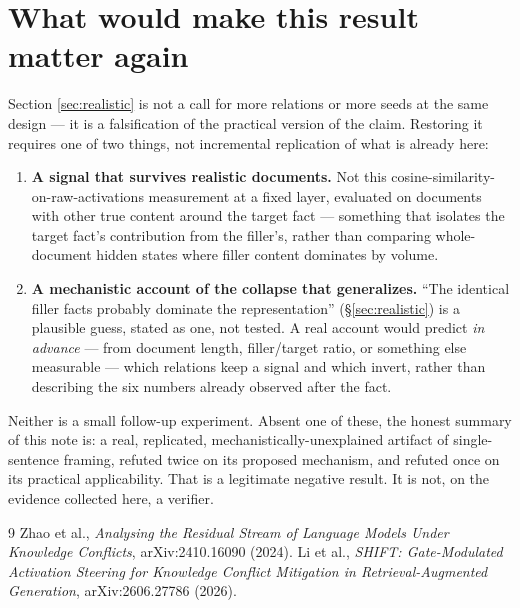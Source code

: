 \documentclass[11pt]{article}
\begin{document}
\section{What would make this result matter again}

Section \ref{sec:realistic} is not a call for more relations or more seeds at
the same design --- it is a falsification of the practical version of the
claim. Restoring it requires one of two things, not incremental replication
of what is already here:

\begin{enumerate}
\item \textbf{A signal that survives realistic documents.} Not this
  cosine-similarity-on-raw-activations measurement at a fixed layer,
  evaluated on documents with other true content around the target fact ---
  something that isolates the target fact's contribution from the filler's,
  rather than comparing whole-document hidden states where filler content
  dominates by volume.
\item \textbf{A mechanistic account of the collapse that generalizes.} ``The
  identical filler facts probably dominate the representation''
  (\S\ref{sec:realistic}) is a plausible guess, stated as one, not tested. A
  real account would predict \emph{in advance} --- from document length,
  filler/target ratio, or something else measurable --- which relations keep
  a signal and which invert, rather than describing the six numbers already
  observed after the fact.
\end{enumerate}

Neither is a small follow-up experiment. Absent one of these, the honest
summary of this note is: a real, replicated, mechanistically-unexplained
artifact of single-sentence framing, refuted twice on its proposed mechanism,
and refuted once on its practical applicability. That is a legitimate
negative result. It is not, on the evidence collected here, a verifier.

\begin{thebibliography}{9}
 Zhao et al., \emph{Analysing the Residual Stream of
  Language Models Under Knowledge Conflicts}, arXiv:2410.16090 (2024).
 Li et al., \emph{SHIFT: Gate-Modulated Activation
  Steering for Knowledge Conflict Mitigation in Retrieval-Augmented
  Generation}, arXiv:2606.27786 (2026).
\end{thebibliography}
\end{document}
